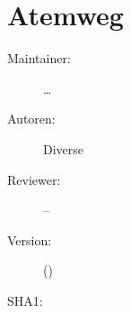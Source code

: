 \def\ChapterCode{FORTBILDUNG}
	\chapter
[\CO{[FORTBILDUNG]} Atemweg]
{Atemweg}
\label{chp:ADVANCED-Atemweg}

\ChapterIntro
{%

}
{%
\begin{description}
  \item[Maintainer:] \ldots
  \item[Autoren:] Diverse
  \item[Reviewer:] --
  \item[Version:] {\DocVersion} ({\DocVersionInfo})
  \item[SHA1:] {\DocGitCommit}
\end{description}

{\TxTeilkapitelAASS}}



\clearpage %


\ChapterEnd
